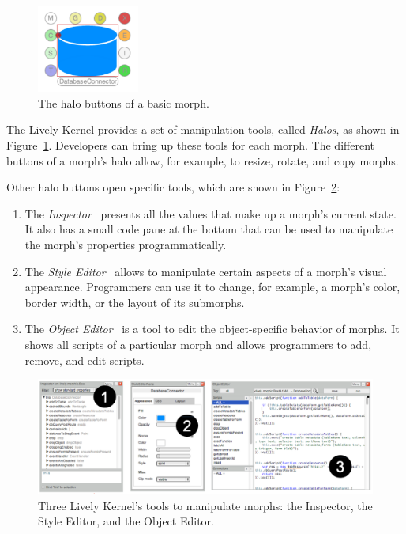 \begin{figure}[h]
    \centering
    \includegraphics[width=0.3\textwidth]{figures/2_background/1_halos.pdf}
    \caption{The halo buttons of a basic morph.}
    \label{fig:Halos}
\end{figure}

The Lively Kernel provides a set of manipulation tools, called \emph{Halos}, as shown in Figure~\ref{fig:Halos}.
Developers can bring up these tools for each morph.
The different buttons of a morph's halo allow, for example, to resize, rotate, and copy morphs.

Other halo buttons open specific tools, which are shown in Figure~\ref{fig:LivelyTools}:

\begin{enumerate}
    \item The \emph{Inspector}~ presents all the values that make up a morph's current state. It also has a small code pane at the bottom that can be used to manipulate the morph's properties programmatically.
    \item The \emph{Style Editor}~ allows to manipulate certain aspects of a morph's visual appearance. Programmers can use it to change, for example, a morph's color, border width, or the layout of its submorphs.
    \item The \emph{Object Editor}~ is a tool to edit the object-specific behavior of morphs. It shows all scripts of a particular morph and allows programmers to add, remove, and edit scripts.
\end{enumerate}

\begin{figure}[h]
    \centering
    \includegraphics[width=\textwidth]{figures/2_background/2_LivelyTools.pdf}
    \caption{Three Lively Kernel's tools to manipulate morphs: the Inspector, the Style Editor, and the Object Editor.}
    \label{fig:LivelyTools}
\end{figure}

